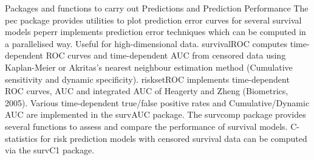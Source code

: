 Packages and functions to carry out Predictions and Prediction Performance 
The pec package provides utilities to plot prediction error curves for several survival models 
peperr implements prediction error techniques which can be computed in a parallelised way. Useful for high-dimensional data. 
survivalROC computes time-dependent ROC curves and time-dependent AUC from censored data using Kaplan-Meier or Akritas's nearest neighbour estimation method (Cumulative sensitivity and dynamic specificity). 
risksetROC implements time-dependent ROC curves, AUC and integrated AUC of Heagerty and Zheng (Biometrics, 2005). 
Various time-dependent true/false positive rates and Cumulative/Dynamic AUC are implemented in the survAUC package. 
The survcomp package provides several functions to assess and compare the performance of survival models. 
C-statistics for risk prediction models with censored survival data can be computed via the survC1 package. 
 





